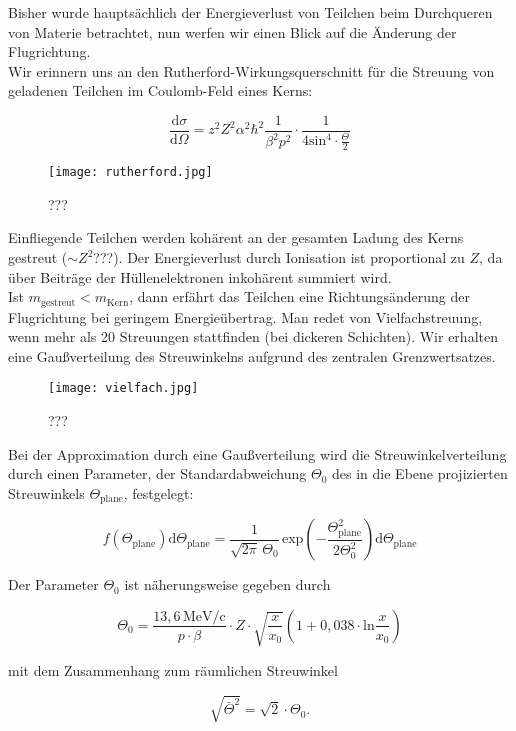 Bisher wurde hauptsächlich der Energieverlust von Teilchen beim Durchqueren von Materie betrachtet,
nun werfen wir einen Blick auf die Änderung der Flugrichtung.
\\
Wir erinnern uns an den Rutherford-Wirkungsquerschnitt für die Streuung von geladenen Teilchen im
Coulomb-Feld eines Kerns:

\[ \frac{\mathrm{d}\sigma}{\mathrm{d}\Omega} = z^2Z^2\alpha^2\hbar^2 \frac{1}{\beta^2 p^2}\cdot
\frac{1}{4\text{sin}^4\cdot\frac{\Theta}{2}}
\]

\begin{figure}[H]
	\centering
	\texttt{[image: rutherford.jpg]}
	\caption{	 ???}
	\label{rutherford}
\end{figure}

Einfliegende Teilchen werden kohärent an der gesamten Ladung des Kerns gestreut ($\sim Z^2$???). Der
Energieverlust durch Ionisation ist proportional zu $Z$, da über Beiträge der Hüllenelektronen
inkohärent summiert wird.
\\ 
Ist $m_\text{gestreut} < m_\text{Kern}$, dann erfährt das Teilchen eine Richtungsänderung der
Flugrichtung bei geringem Energieübertrag. Man redet von Vielfachstreuung, wenn mehr als 20
Streuungen stattfinden (bei dickeren Schichten). Wir erhalten eine Gaußverteilung des Streuwinkelns
aufgrund des zentralen Grenzwertsatzes.

\begin{figure}[H]
	\centering
	\texttt{[image: vielfach.jpg]}
	\caption{	 ???}
	\label{vielfach}
\end{figure}

Bei der Approximation durch eine Gaußverteilung wird die Streuwinkelverteilung durch einen
Parameter, der Standardabweichung $\Theta_0$ des in die Ebene projizierten Streuwinkels
$\Theta_\text{plane}$, festgelegt:

\[f(\Theta_\text{plane}) \mathrm{d}\Theta_\text{plane} =
\frac{1}{\sqrt{2\pi}\,\Theta_0} \,\text{exp}\left(-\frac{\Theta_\text{plane}^2}{2\Theta_0^2} \right)
\mathrm{d}\Theta_\text{plane}\]

Der Parameter $\Theta_0$ ist näherungsweise gegeben durch

\[\Theta_0 = \frac{13{,}6\,\text{MeV/c}}{p\cdot\beta} \cdot Z\cdot
\sqrt{\frac{x}{x_0}}\left(1+0{,}038\cdot\text{ln}\frac{x}{x_0} \right)   \]

mit dem Zusammenhang zum räumlichen Streuwinkel

\[\sqrt{\bar{\Theta}^2} = \sqrt{2}\cdot\Theta_0.  \]

